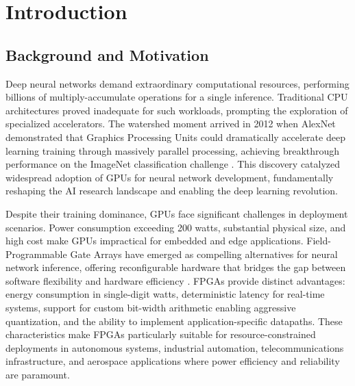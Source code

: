 \documentclass[12pt,a4paper]{report}
\begin{document}
\thispagestyle{empty}
\mbox{}
\newpage

\setcounter{page}{7}
\tableofcontents
\thispagestyle{fancy}
\newpage

\chapter{Introduction}

\section{Background and Motivation}

Deep neural networks demand extraordinary computational resources, performing billions of multiply-accumulate operations for a single inference. Traditional CPU architectures proved inadequate for such workloads, prompting the exploration of specialized accelerators. The watershed moment arrived in 2012 when AlexNet demonstrated that Graphics Processing Units could dramatically accelerate deep learning training through massively parallel processing, achieving breakthrough performance on the ImageNet classification challenge \parencite{alexnet}. This discovery catalyzed widespread adoption of GPUs for neural network development, fundamentally reshaping the AI research landscape and enabling the deep learning revolution.

Despite their training dominance, GPUs face significant challenges in deployment scenarios. Power consumption exceeding 200 watts, substantial physical size, and high cost make GPUs impractical for embedded and edge applications. Field-Programmable Gate Arrays have emerged as compelling alternatives for neural network inference, offering reconfigurable hardware that bridges the gap between software flexibility and hardware efficiency \parencite{fpga_cnn_survey}. FPGAs provide distinct advantages: energy consumption in single-digit watts, deterministic latency for real-time systems, support for custom bit-width arithmetic enabling aggressive quantization, and the ability to implement application-specific datapaths. These characteristics make FPGAs particularly suitable for resource-constrained deployments in autonomous systems, industrial automation, telecommunications infrastructure, and aerospace applications where power efficiency and reliability are paramount.
\end{document}
